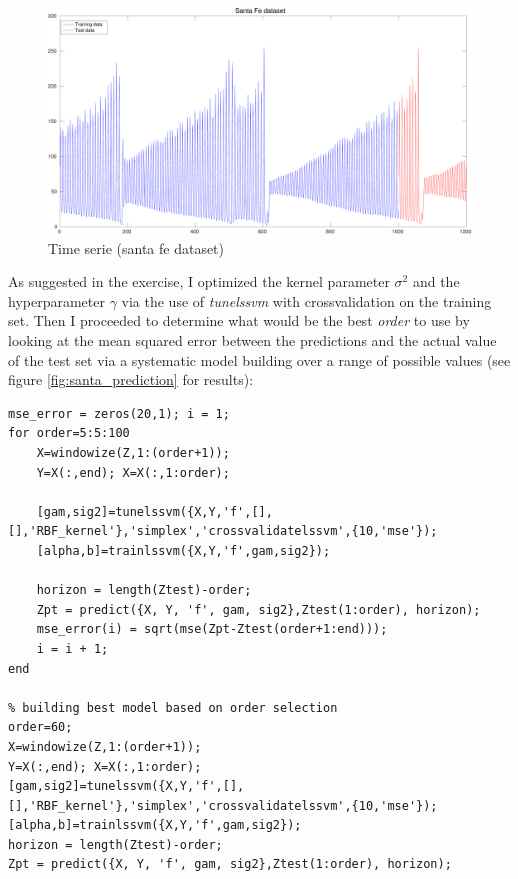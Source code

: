 \documentclass[11pt, a4paper]{article}
\begin{document}
\begin{figure}[H]
    \centering
    \includegraphics[scale=.40]{santafe_dataset.pdf}
    \caption{Time serie (santa fe dataset)}
    \label{fig:santa_fe}
\end{figure}

As suggested in the exercise, I optimized the kernel parameter
$\sigma^2$ and the hyperparameter $\gamma$ via the use of
\emph{tunelssvm} with crossvalidation on the training set. Then I
proceeded to determine what would be the best \emph{order} to use by
looking at the mean squared error between the predictions and the
actual value of the test set via a systematic model building over a
range of possible values (see figure \ref{fig:santa_prediction} for
results):

\begin{lstlisting}
mse_error = zeros(20,1); i = 1;
for order=5:5:100
    X=windowize(Z,1:(order+1));
    Y=X(:,end); X=X(:,1:order);

    [gam,sig2]=tunelssvm({X,Y,'f',[],[],'RBF_kernel'},'simplex','crossvalidatelssvm',{10,'mse'});
    [alpha,b]=trainlssvm({X,Y,'f',gam,sig2});

    horizon = length(Ztest)-order;
    Zpt = predict({X, Y, 'f', gam, sig2},Ztest(1:order), horizon);
    mse_error(i) = sqrt(mse(Zpt-Ztest(order+1:end)));
    i = i + 1;
end

% building best model based on order selection
order=60;
X=windowize(Z,1:(order+1));
Y=X(:,end); X=X(:,1:order);
[gam,sig2]=tunelssvm({X,Y,'f',[],[],'RBF_kernel'},'simplex','crossvalidatelssvm',{10,'mse'});
[alpha,b]=trainlssvm({X,Y,'f',gam,sig2});
horizon = length(Ztest)-order;
Zpt = predict({X, Y, 'f', gam, sig2},Ztest(1:order), horizon);
\end{lstlisting}
\end{document}
